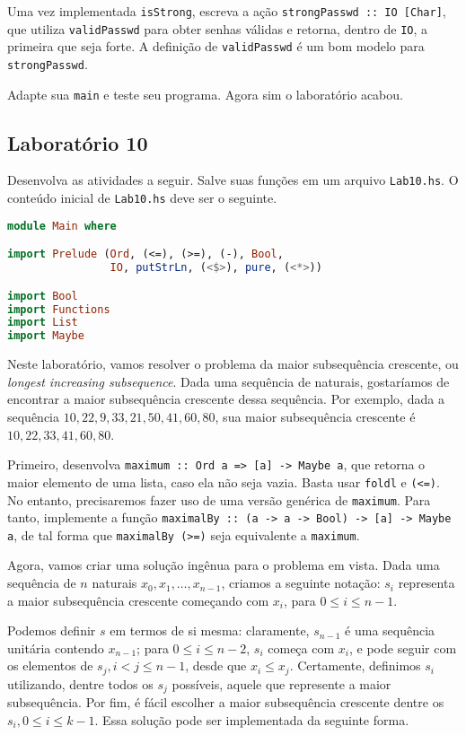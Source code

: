 \documentclass[a4paper]{article}
\begin{document}
Uma vez implementada \texttt{isStrong}, escreva a ação \texttt{strongPasswd :: IO [Char]}, que utiliza \texttt{validPasswd} para obter senhas válidas e retorna, dentro de \texttt{IO}, a primeira que seja forte.
A definição de \texttt{validPasswd} é um bom modelo para \texttt{strongPasswd}.

Adapte sua \texttt{main} e teste seu programa.
Agora sim o laboratório acabou.

\subsection{Laboratório 10}

Desenvolva as atividades a seguir.
Salve suas funções em um arquivo \texttt{Lab10.hs}.
O conteúdo inicial de \texttt{Lab10.hs} deve ser o seguinte.

\begin{lstlisting}[language=haskell, frame=single]
module Main where

import Prelude (Ord, (<=), (>=), (-), Bool,
                IO, putStrLn, (<$>), pure, (<*>))

import Bool
import Functions
import List
import Maybe
\end{lstlisting}

Neste laboratório, vamos resolver o problema da maior subsequência crescente, ou \emph{longest increasing subsequence}.
Dada uma sequência de naturais, gostaríamos de encontrar a maior subsequência crescente dessa sequência.
Por exemplo, dada a sequência $10, 22, 9, 33, 21, 50, 41, 60, 80$, sua maior subsequência crescente é $10, 22, 33, 41, 60, 80$.

Primeiro, desenvolva \texttt{maximum :: Ord a => [a] -> Maybe a}, que retorna o maior elemento de uma lista, caso ela não seja vazia.
Basta usar \texttt{foldl} e \texttt{(<=)}.
No entanto, precisaremos fazer uso de uma versão genérica de \texttt{maximum}.
Para tanto, implemente a função \mbox{\texttt{maximalBy :: (a -> a -> Bool) -> [a] -> Maybe a}}, de tal forma que \texttt{maximalBy (>=)} seja equivalente a \texttt{maximum}.

Agora, vamos criar uma solução ingênua para o problema em vista.
Dada uma sequência de $n$ naturais $x_0, x_1, \dots, x_{n - 1}$, criamos a seguinte notação:
$s_i$ representa a maior subsequência crescente começando com $x_i$, para $0 \leq i \leq n - 1$.

Podemos definir $s$ em termos de si mesma:
claramente, $s_{n - 1}$ é uma sequência unitária contendo $x_{n - 1}$;
para $0 \leq i \leq n - 2$, $s_i$ começa com $x_i$, e pode seguir com os elementos de $s_j, i < j \leq n - 1$, desde que $x_i \leq x_j$.
Certamente, definimos $s_i$ utilizando, dentre todos os $s_j$ possíveis, aquele que represente a maior subsequência.
Por fim, é fácil escolher a maior subsequência crescente dentre os $s_i, 0 \leq i \leq k - 1$.
Essa solução pode ser implementada da seguinte forma.
\end{document}
